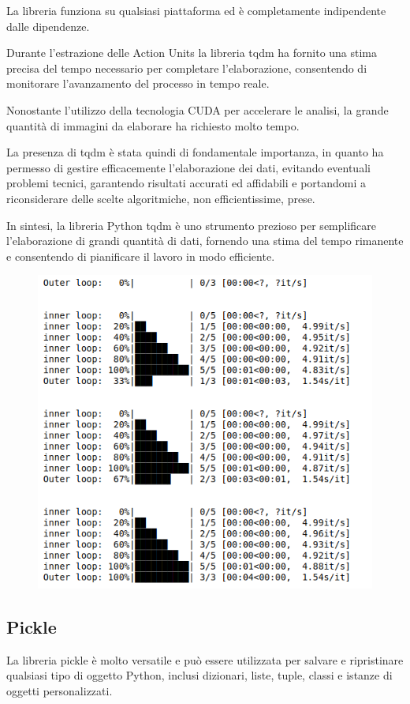 La libreria funziona su qualsiasi piattaforma ed è completamente indipendente dalle dipendenze. 

Durante l'estrazione delle Action Units la libreria tqdm ha fornito una stima precisa del tempo necessario per completare l'elaborazione, consentendo di monitorare l'avanzamento del processo in tempo reale. 

Nonostante l'utilizzo della tecnologia CUDA per accelerare le analisi, la grande quantità di immagini da elaborare ha richiesto molto tempo. 

La presenza di tqdm è stata quindi di fondamentale importanza, in quanto ha permesso di gestire efficacemente l'elaborazione dei dati, evitando eventuali problemi tecnici, garantendo risultati accurati ed affidabili e portandomi a riconsiderare delle scelte algoritmiche, non efficientissime, prese. 

In sintesi, la libreria Python tqdm è uno strumento prezioso per semplificare l'elaborazione di grandi quantità di dati, fornendo una stima del tempo rimanente e consentendo di pianificare il lavoro in modo efficiente.

\begin{figure}
    \begin{center}    
        \includegraphics[width=0.9\linewidth]{images/image5.png}
    \end{center}
\end{figure}

\subsection{Pickle}
La libreria pickle è molto versatile e può essere utilizzata per salvare e ripristinare qualsiasi tipo di oggetto Python, inclusi dizionari, liste, tuple, classi e istanze di oggetti personalizzati. 

